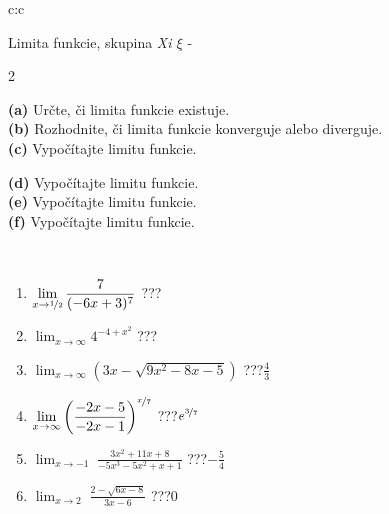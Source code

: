 \documentclass[10pt]{report}
\begin{document}
\newpage
\thispagestyle{empty}
\begin{tabular}{c:c}
\begin{minipage}[c][104.5mm][t]{0.5\linewidth}
\begin{center}
\vspace{7mm}
{\huge Limita funkcie, skupina \textit{Xi $\xi$} -}\\[5mm]
\begin{minipage}{0.95\linewidth}
\begin{center}
{\small \begin{multicols}{2} \raggedright
\textbf{(a)} Určte, či limita funkcie existuje. \\[1mm]
\textbf{(b)} Rozhodnite, či limita funkcie konverguje alebo diverguje. \\[1mm]
\textbf{(c)} Vypočítajte limitu funkcie. \par \columnbreak
\textbf{(d)} Vypočítajte limitu funkcie. \\[1mm]
\textbf{(e)} Vypočítajte limitu funkcie. \\[1mm]
\textbf{(f)} Vypočítajte limitu funkcie. \\[1mm]
\end{multicols}
}
\end{center}
\end{minipage}
\\[4mm]
\begin{minipage}{0.79\linewidth}
\begin{center}
\begin{varwidth}{\linewidth}
\begin{enumerate}
\normalsize
\item $\displaystyle\lim_{x\to\nicefrac{1}{2}}{\frac{7}{(-6x+3)^{7}}}$\quad \dotfill\; ???\;\dotfill \quad {}
\item $\displaystyle\lim_{x\to\infty}{4^{-4+x^2}}$\quad \dotfill\; ???\;\dotfill \quad {}
\item $\displaystyle\lim_{x\to\infty}{\left(3x - \sqrt{9x^2-8x-5}\right)}$\quad \dotfill\; ???\;\dotfill \quad $\frac{4}{3}$
\item $\displaystyle\lim_{x\to\infty}{\left( \frac{-2x-5}{-2x-1} \right)^{\nicefrac{x}{7}}}$\quad \dotfill\; ???\;\dotfill \quad $e^{\nicefrac{3}{7}}$
\item $\displaystyle\lim_{x\to -1}{\;\frac{3x^2+11x+8}{-5x^3-5x^2+x+1}}$\quad \dotfill\; ???\;\dotfill \quad $-\frac{5}{4}$
\item $\displaystyle\lim_{x\to 2}{\;\frac{2-\sqrt{6x-8}}{3x-6}}$\quad \dotfill\; ???\;\dotfill \quad $0$

\end{enumerate}
\end{varwidth}
\end{center}
\end{minipage}
\end{center}
\end{minipage}
\end{tabular}
\end{document}
